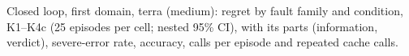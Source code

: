 \begin{table}[!htbp]
\centering
\caption{Closed loop, first domain, terra (medium): regret by fault family and condition, K1--K4c (25 episodes per cell; nested 95\% CI), with its parts (information, verdict), severe-error rate, accuracy, calls per episode and repeated cache calls.}
\label{tab:agent-llm-terra}
\scriptsize
\setlength{\tabcolsep}{3pt}
\resizebox{\linewidth}{!}{}
\end{table}
